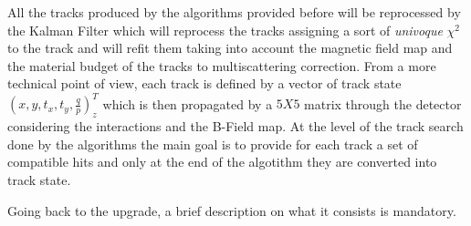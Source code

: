 \documentclass[paper=a4, fontsize=10pt]{scrartcl}
\numberwithin{equation}{section}		%
\numberwithin{figure}{section}			%
\numberwithin{table}{section}				%
\begin{document}
\begin{itemize}
{All the tracks produced by the algorithms provided before will be reprocessed by the Kalman Filter which will reprocess the tracks assigning a sort of \textit{univoque} $\chi^{2}$ to the track and will refit them taking into account the magnetic field map and the material budget of the tracks to multiscattering correction. From a more technical point of view, each track is defined by a vector of track state $\left( x, y, t_{x}, t_{y} , \frac{q}{p} \right)_{z}^{T}$ which is then propagated by a $5X5$ matrix through the detector considering the interactions and the B-Field map. At the level of the track search done by the algorithms the main goal is to provide for each track a set of compatible hits and only at the end of the algotithm they are converted into track state.

Going back to the upgrade, a brief description on what it consists is mandatory.



}
\end{itemize}
\end{document}

